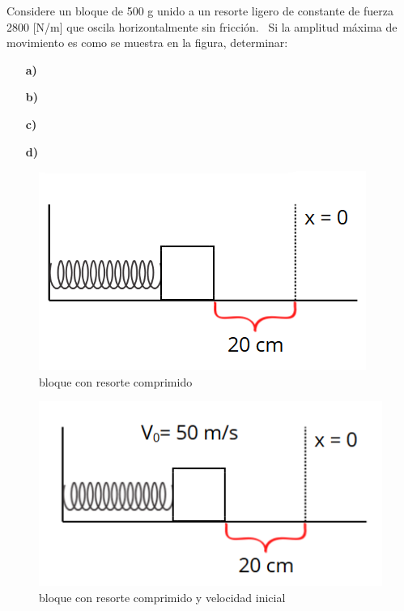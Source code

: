 \documentclass[a4paper,12pt,numbers=noenddot]{scrreprt}
\begin{document}
\begin{minipage}{\textwidth}
  \raggedright
  Considere un bloque de 500 g unido a un resorte ligero de constante de fuerza 2800 [N/m] que oscila horizontalmente sin fricción. \ Si la amplitud máxima de movimiento es como se muestra en la figura, determinar:
\end{minipage}

\begin{itemize}
    \item [\textbf{a)}] 
    \item [\textbf{b)}] 
    \item [\textbf{c)}] 
    \item [\textbf{d)}] 
\end{itemize}

\begin{center}
\begin{figure}
      \centering
      \includegraphics[width=0.5\linewidth]{Ejercicio1.png}
      \caption{bloque con resorte comprimido}
      \label{fig:enter-label}
  \end{figure}
    \end{center}


\begin{figure}[h]\centering\includegraphics[width=0.5\linewidth]{Ejercicio2.png}\caption{bloque con resorte comprimido y velocidad inicial}\label{fig:enter-label}\end{figure}
    
\end{document}
